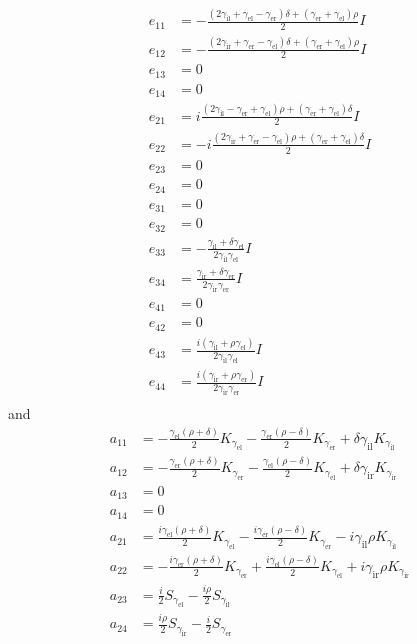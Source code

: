 \begin{align*}
  e_{11} &= -\frac{(2\gamma_\text{il} + \gamma_\text{el} - \gamma_\text{er})\delta + (\gamma_\text{er}+\gamma_\text{el})\rho}{2} I\\
  e_{12} &= -\frac{(2\gamma_\text{ir}+\gamma_\text{er}-\gamma_\text{el})\delta + (\gamma_\text{er}+\gamma_\text{el})\rho}{2} I \\
  e_{13} &= 0 \\
  e_{14} &= 0 \\
  e_{21} &= i \frac{(2 \gamma_\text{il} -\gamma_\text{er} +\gamma_\text{el}) \rho+ (\gamma_\text{er}+\gamma_\text{el})\delta}{2} I\\
  e_{22} &= -i \frac{(2 \gamma_\text{ir}+\gamma_\text{er} -\gamma_\text{el})\rho+(\gamma_\text{er}+\gamma_\text{el})\delta}{2} I \\
  e_{23} &= 0\\
  e_{24} &= 0\\
  e_{31} &= 0 \\
  e_{32} &= 0\\
  e_{33} &= -\frac{\gamma_\text{il} + \delta\gamma_\text{el}}{2 \gamma_\text{il}\gamma_\text{el}}I\\
  e_{34} &= \frac{\gamma_\text{ir} + \delta\gamma_\text{er}}{2 \gamma_\text{ir}\gamma_\text{er}}I \\
  e_{41} &= 0 \\
  e_{42} &= 0 \\
  e_{43} &= \frac{i(\gamma_\text{il} + \rho\gamma_\text{el})}{2 \gamma_\text{il}\gamma_\text{el}} I \\
  e_{44} &= \frac{i(\gamma_\text{ir} + \rho\gamma_\text{er})}{2 \gamma_\text{ir}\gamma_\text{er}} I \\
\end{align*}
and
\begin{align*}
  a_{11} &= - \frac{\gamma_\text{el}(\rho+\delta)}{2} K_{\gamma_\text{el}}-\frac{\gamma_\text{er}(\rho-\delta)}{2} K_{\gamma_\text{er}} + \delta \gamma_\text{il} K_{\gamma_\text{il}} \\
  a_{12} &= - \frac{\gamma_\text{er}(\rho+\delta)}{2} K_{\gamma_\text{er}} - \frac{\gamma_\text{el}(\rho-\delta)}{2} K_{\gamma_\text{el}} + \delta \gamma_\text{ir} K_{\gamma_\text{ir}} \\
  a_{13} &= 0 \\
  a_{14} &= 0 \\
  a_{21} &= \frac{i\gamma_\text{el}(\rho+\delta)}{2} K_{\gamma_\text{el}} - \frac{i\gamma_\text{er}(\rho-\delta)}{2} K_{\gamma_\text{er}} -i \gamma_\text{il}\rho K_{\gamma_\text{il}} \\
  a_{22} &= -\frac{i\gamma_\text{er}(\rho+\delta)}{2} K_{\gamma_\text{er}} + \frac{i \gamma_\text{el}(\rho-\delta)}{2} K_{\gamma_\text{el}}+i \gamma_\text{ir}\rho K_{\gamma_\text{ir}} \\
  a_{23} &= \frac{i}{2} S_{\gamma_\text{el}} - \frac{i \rho}{2} S_{\gamma_\text{il}}\\
  a_{24} &= \frac{i \rho}{2} S_{\gamma_\text{ir}} - \frac{i}{2} S_{\gamma_\text{er}}\\
\end{align*}

